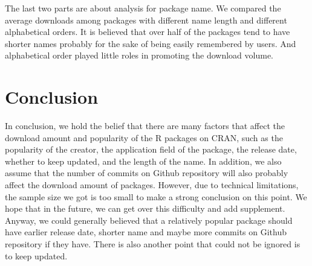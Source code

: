 \documentclass[
]{book}
\begin{document}
The last two parts are about analysis for package name. We compared the average downloads among packages with different name length and different alphabetical orders. It is believed that over half of the packages tend to have shorter names probably for the sake of being easily remembered by users. And alphabetical order played little roles in promoting the download volume.

\hypertarget{conclusion}{%
\chapter{Conclusion}\label{conclusion}}

In conclusion, we hold the belief that there are many factors that affect the download amount and popularity of the R packages on CRAN, such as the popularity of the creator, the application field of the package, the release date, whether to keep updated, and the length of the name. In addition, we also assume that the number of commits on Github repository will also probably affect the download amount of packages. However, due to technical limitations, the sample size we got is too small to make a strong conclusion on this point. We hope that in the future, we can get over this difficulty and add supplement. Anyway, we could generally believed that a relatively popular package should have earlier release date, shorter name and maybe more commits on Github repository if they have. There is also another point that could not be ignored is to keep updated.

  
\end{document}
